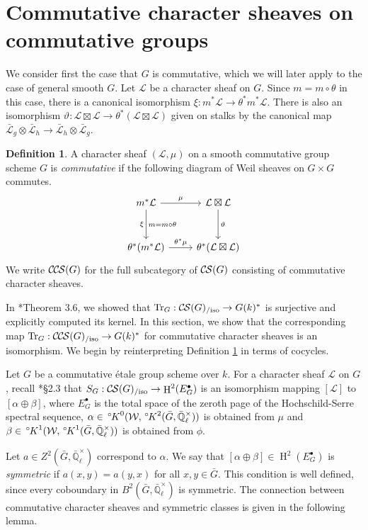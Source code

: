 \documentclass[10pt]{amsart}
\theoremstyle{plain}
\theoremstyle{definition}
\newtheorem{definition}[theorem]{Definition}
\newcommand{\EE}{\mathbb{\bar Q}_\ell}
\newcommand{\EEx}{\EE^\times}
\newcommand{\Weil}[1]{\mathcal{W}_{#1}}
\DeclareMathOperator{\Hh}{H}
\DeclareMathOperator{\Tr}{Tr}
\newcommand{\TrFrob}[1]{\Tr_{#1}}
\newcommand{\cs}[1]{{\mathcal{#1}}}
\newcommand{\gcs}[1]{{\mathcal{\bar #1}}}
\newcommand{\CS}{{\mathcal{C\hskip-0.8pt S}}}
\newcommand{\CCS}{{\mathcal{C\hskip-.8pt C\hskip-0.8pt S}}}
\newcommand{\CSiso}[1]{\CS(#1)_{/\text{iso}}}
\newcommand{\CCSiso}[1]{\CCS(#1)_{/\text{iso}}}
\newcommand{\bG}{\bar{G}}
\newcommand{\oK}{{\,^\circ \hskip-1pt K}}
\begin{document}
\section{Commutative character sheaves on commutative groups}\label{sec:comcom}

We consider first the case that $G$ is commutative, which we will later apply to the case of general smooth $G$.
Let $\cs{L}$ be a character sheaf on $G$.  Since $m = m \circ \theta$ in this case,
there is a canonical isomorphism $\xi : m^* \cs{L} \to \theta^* m^* \cs{L}$.
There is also an isomorphism $\vartheta : \cs{L}\boxtimes\cs{L} \to \theta^*(\cs{L}\boxtimes\cs{L})$
given on stalks by the canonical map $\gcs{L}_{g} \otimes \gcs{L}_{h} \to \gcs{L}_{h} \otimes \gcs{L}_{g}$.

\begin{definition}\label{def:CCScom}
A character sheaf $(\cs{L}, \mu)$ on a smooth commutative group scheme $G$ is \emph{commutative}
if the following diagram of Weil sheaves on $G \times G$ commutes.
  \[
  \begin{tikzcd}[row sep=30]
   m^*\cs{L} \arrow{d}[swap]{\xi}{m= m\circ\theta} \arrow{r}{\mu} & \cs{L}\boxtimes\cs{L} \arrow{d}{\vartheta}\\
   \theta^*(m^*\cs{L}) \arrow{r}{{\theta}^*\mu} &  \theta^*(\cs{L}\boxtimes\cs{L})
  \end{tikzcd}
  \]
We write $\CCS(G)$ for the full subcategory of $\CS(G)$ consisting of commutative character sheaves.
 \end{definition}

In \cite{cunningham-roe:13a}*{Theorem 3.6}, we showed that $\TrFrob{G} : \CSiso{G} \to G(k)^*$ is surjective and
explicitly computed its kernel.  In this section, we show that the corresponding map
$\TrFrob{G} : \CCSiso{G} \to G(k)^*$ for commutative character sheaves is an isomorphism.
We begin by reinterpreting Definition \ref{def:CCScom} in terms of cocycles.

Let $G$ be a commutative \'etale group scheme over $k$. For a character sheaf $\cs{L}$ on $G$, recall
\cite{cunningham-roe:13a}*{\S 2.3} that $S_G : \CSiso{G} \to \Hh^2(E_G^\bullet)$ is an isomorphism mapping
$[\cs{L}]$ to $[\alpha \oplus \beta]$, where $E_G^\bullet$ is the total space of the zeroth page
of the Hochschild-Serre spectral sequence, $\alpha \in \oK^0(\Weil{}, \oK^2(\bG, \EEx))$ is obtained from $\mu$ and
$\beta \in \oK^1(\Weil{}, \oK^1(\bG, \EEx))$ is obtained from $\phi$.

Let $a \in Z^2(\bG, \EEx)$ correspond to $\alpha$.  We say that $[\alpha \oplus \beta] \in \Hh^2(E_G^\bullet)$
is \emph{symmetric} if $a(x,y) = a(y,x)$ for all $x,y \in \bG$.  This condition is well defined, since every
coboundary in $B^2(\bG, \EEx)$ is symmetric.  The connection between commutative character sheaves
and symmetric classes is given in the following lemma.
\end{document}
